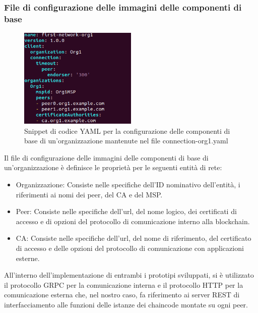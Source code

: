 \subsubsection{File di configurazione delle immagini delle componenti di base}
\begin{figure}[h]
    \centering
    \includegraphics[width=0.5\textwidth]{img/connection-config-yaml.png}
    \caption{Snippet di codice YAML per la configurazione delle componenti di base di un'organizzazione mantenute nel file connection-org1.yaml}
    \label{fig:connection-config-yaml}
\end{figure}
Il file di configurazione delle immagini delle componenti di base di un'organizzazione è  definisce le proprietà per le seguenti entità di rete: 
\begin{itemize}
    \item Organizzazione: Consiste nelle specifiche dell'ID nominativo dell'entità, i riferimenti ai nomi dei peer, del CA e del MSP. 
    \item Peer: Consiste nelle specifiche dell'url, del nome logico, dei certificati di accesso e di opzioni del protocollo di comunicazione interno alla blockchain.
    \item CA: Consiste nelle specifiche dell'url, del nome di riferimento, del certificato di accesso e delle opzioni del protocollo di comunicazione con applicazioni esterne. 
\end{itemize}
All'interno dell'implementazione di entrambi i prototipi sviluppati, si è utilizzato il protocollo GRPC per la comunicazione interna e il protocollo HTTP per la comunicazione esterna che, nel nostro caso, fa riferimento ai server REST di interfacciamento alle funzioni delle istanze dei chaincode montate su ogni peer. 
